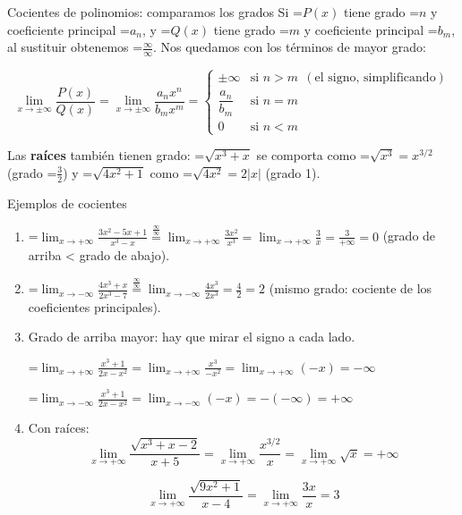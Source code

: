 \documentclass[11pt,a4paper]{article}
\newcommand{\lt}{<}\newcommand{\gt}{>}
\newcommand{\fmm}[1]{\setbox0=\hbox{$#1$}\ifdim\wd0>\linewidth\[#1\]\else\mbox{\box0}\fi}
\begin{document}
  
\begin{fmdef}{Cocientes de polinomios: comparamos los grados}
Si \fmm{P(x)} tiene grado \fmm{n} y coeficiente principal \fmm{a_n}, y \fmm{Q(x)} tiene grado \fmm{m} y coeficiente principal \fmm{b_m}, al sustituir obtenemos \fmm{\frac{\infty}{\infty}}. Nos quedamos con los términos de mayor grado:

      
\[\lim_{x\to\pm\infty}\frac{P(x)}{Q(x)}=\lim_{x\to\pm\infty}\frac{a_nx^n}{b_mx^m}=\begin{cases}\pm\infty&\text{si } n\gt m\ \ (\text{el signo, simplificando})\\[4pt]\dfrac{a_n}{b_m}&\text{si } n=m\\[8pt]0&\text{si } n\lt m\end{cases}\]

      

Las \textbf{raíces} también tienen grado: \fmm{\sqrt{x^3+x}} se comporta como \fmm{\sqrt{x^3}=x^{3/2}} (grado \fmm{\tfrac32}) y \fmm{\sqrt{4x^2+1}} como \fmm{\sqrt{4x^2}=2|x|} (grado 1).
\end{fmdef}

  
\begin{fmex}{Ejemplos de cocientes}
\begin{enumerate}[label=\textbf{\arabic*.},leftmargin=*]
\item \fmm{\displaystyle\lim_{x\to+\infty}\frac{3x^2-5x+1}{x^3-x}\overset{\frac{\infty}{\infty}}{=}\lim_{x\to+\infty}\frac{3x^2}{x^3}=\lim_{x\to+\infty}\frac{3}{x}=\frac{3}{+\infty}=0} (grado de arriba < grado de abajo).
\item \fmm{\displaystyle\lim_{x\to-\infty}\frac{4x^3+x}{2x^3-7}\overset{\frac{\infty}{\infty}}{=}\lim_{x\to-\infty}\frac{4x^3}{2x^3}=\frac42=2} (mismo grado: cociente de los coeficientes principales).
\item Grado de arriba mayor: hay que mirar el signo a cada lado.
          

            

\fmm{\displaystyle\lim_{x\to+\infty}\frac{x^3+1}{2x-x^2}=\lim_{x\to+\infty}\frac{x^3}{-x^2}=\lim_{x\to+\infty}(-x)=-\infty}

            

\fmm{\displaystyle\lim_{x\to-\infty}\frac{x^3+1}{2x-x^2}=\lim_{x\to-\infty}(-x)=-(-\infty)=+\infty}
\item Con raíces: 
\[\lim_{x\to+\infty}\frac{\sqrt{x^3+x-2}}{x+5}=\lim_{x\to+\infty}\frac{x^{3/2}}{x}=\lim_{x\to+\infty}\sqrt{x}=+\infty\]

\[\lim_{x\to+\infty}\frac{\sqrt{9x^2+1}}{x-4}=\lim_{x\to+\infty}\frac{3x}{x}=3\]

\end{enumerate}
\end{fmex}
\end{document}
